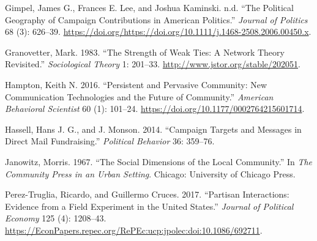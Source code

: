 \documentclass[12pt,]{article}
\begin{document}
\leavevmode\hypertarget{ref-gimpel2006}{}%
Gimpel, James G., Frances E. Lee, and Joshua Kaminski. n.d. ``The
Political Geography of Campaign Contributions in American Politics.''
\emph{Journal of Politics} 68 (3): 626--39.
\url{https://doi.org/https://doi.org/10.1111/j.1468-2508.2006.00450.x}.

\leavevmode\hypertarget{ref-granovetter1983}{}%
Granovetter, Mark. 1983. ``The Strength of Weak Ties: A Network Theory
Revisited.'' \emph{Sociological Theory} 1: 201--33.
\url{http://www.jstor.org/stable/202051}.

\leavevmode\hypertarget{ref-hampton2015}{}%
Hampton, Keith N. 2016. ``Persistent and Pervasive Community: New
Communication Technologies and the Future of Community.'' \emph{American
Behavioral Scientist} 60 (1): 101--24.
\url{https://doi.org/10.1177/0002764215601714}.

\leavevmode\hypertarget{ref-hassell2014}{}%
Hassell, Hans J. G., and J. Monson. 2014. ``Campaign Targets and
Messages in Direct Mail Fundraising.'' \emph{Political Behavior} 36:
359--76.

\leavevmode\hypertarget{ref-janowitz1967}{}%
Janowitz, Morris. 1967. ``The Social Dimensions of the Local
Community.'' In \emph{The Community Press in an Urban Setting}. Chicago:
University of Chicago Press.

\leavevmode\hypertarget{ref-perez2017}{}%
Perez-Truglia, Ricardo, and Guillermo Cruces. 2017. ``Partisan
Interactions: Evidence from a Field Experiment in the United States.''
\emph{Journal of Political Economy} 125 (4): 1208--43.
\url{https://EconPapers.repec.org/RePEc:ucp:jpolec:doi:10.1086/692711}.





\newpage
\singlespacing 
\end{document}
